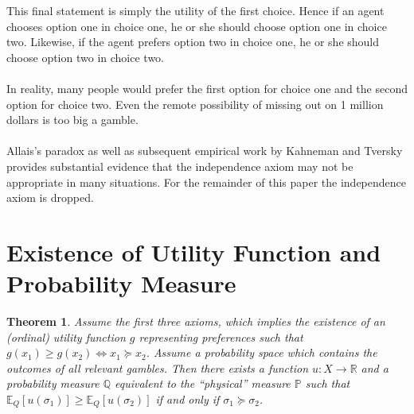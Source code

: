 \documentclass{article}
\newtheorem{theorem}{Theorem}
\begin{document}
This final statement is simply the utility of the first choice.  Hence if an agent chooses option one in choice one, he or she should choose option one in choice two.  Likewise, if the agent prefers option two in choice one, he or she should choose option two in choice two.
\\
\\
In reality, many people would prefer the first option for choice one and the second option for choice two.  Even the remote possibility of missing out on 1 million dollars is too big a gamble. 
\\
\\
Allais's paradox as well as subsequent empirical work by Kahneman and Tversky provides substantial evidence that the independence axiom may not be appropriate in many situations.  For the remainder of this paper the independence axiom is dropped.  

 
\section{Existence of Utility Function and Probability Measure}

\begin{theorem} \label{theorem1}
Assume the first three axioms, which implies the existence of an (ordinal) utility function \(g\) representing preferences such that \(g(x_1)\geq g(x_2) \Leftrightarrow x_1 \succeq x_2 \).  Assume a probability space which contains the outcomes of all relevant gambles. Then there exists a function \(u: X \to \mathbb{R}\) and a probability measure \(\mathbb{Q}\) equivalent to the ``physical'' measure \(\mathbb{P}\) such that \(\mathbb{E}_Q\left[u(\sigma_1)\right] \geq \mathbb{E}_Q\left[u(\sigma_2)\right]\) if and only if \(\sigma_1 \succeq \sigma_2\).  
\end{theorem} 
\end{document}

